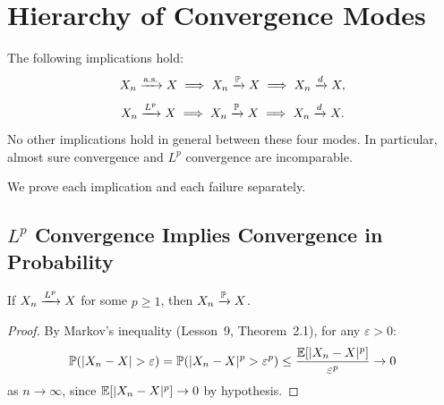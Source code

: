 \documentclass[11pt,a4paper]{article}
\begin{document}

\section{Hierarchy of Convergence Modes}
\label{sec:hierarchy}

\begin{keyresult}[title={Convergence Implications}]
\begin{theorem}
\label{thm:conv_hierarchy}
The following implications hold:
\begin{equation}
  X_n \xrightarrow{\text{a.s.}} X \;\Longrightarrow\;
  X_n \xrightarrow{\mathbb{P}} X \;\Longrightarrow\;
  X_n \xrightarrow{d} X,
  \label{eq:hierarchy_1}
\end{equation}
\begin{equation}
  X_n \xrightarrow{L^{p}} X \;\Longrightarrow\;
  X_n \xrightarrow{\mathbb{P}} X \;\Longrightarrow\;
  X_n \xrightarrow{d} X.
  \label{eq:hierarchy_2}
\end{equation}
No other implications hold in general between these four modes.
In particular, almost sure convergence and $L^p$ convergence are
incomparable.
\end{theorem}
\end{keyresult}

We prove each implication and each failure separately.

\subsection{$L^p$ Convergence Implies Convergence in Probability}
\label{subsec:lp_to_prob}

\begin{theorem}
\label{thm:lp_to_prob}
If $X_n \xrightarrow{L^{p}} X$ for some $p \geq 1$, then $X_n \xrightarrow{\mathbb{P}} X$.
\end{theorem}

\begin{proof}
By Markov's inequality (Lesson~9, Theorem~2.1), for any
$\varepsilon > 0$:
\begin{equation}
  \mathbb{P}(|X_n - X| > \varepsilon)
  = \mathbb{P}(|X_n - X|^p > \varepsilon^p)
  \leq \frac{\mathbb{E}[|X_n - X|^p]}{\varepsilon^p} \to 0
  \label{eq:lp_to_prob_proof}
\end{equation}
as $n \to \infty$, since $\mathbb{E}[|X_n - X|^p] \to 0$ by hypothesis.
\end{proof}
\end{document}
